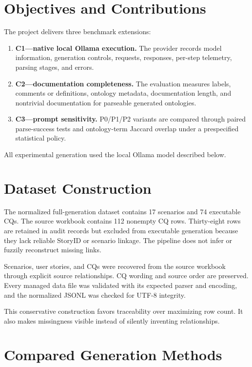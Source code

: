 \documentclass[11pt,a4paper]{article}
\begin{document}
\section{Objectives and Contributions}

The project delivers three benchmark extensions:

\begin{enumerate}
  \item \textbf{C1---native local Ollama execution.}
  The provider records model information, generation controls, requests,
  responses, per-step telemetry, parsing stages, and errors.

  \item \textbf{C2---documentation completeness.}
  The evaluation measures labels, comments or definitions, ontology
  metadata, documentation length, and nontrivial documentation for parseable
  generated ontologies.

  \item \textbf{C3---prompt sensitivity.}
  P0/P1/P2 variants are compared through paired parse-success tests and
  ontology-term Jaccard overlap under a prespecified statistical policy.
\end{enumerate}

All experimental generation used the local Ollama model described below.

\section{Dataset Construction}

The normalized full-generation dataset contains 17 scenarios and 74 executable
CQs. The source workbook contains 112 nonempty CQ rows. Thirty-eight rows are
retained in audit records but excluded from executable generation because they
lack reliable StoryID or scenario linkage. The pipeline does not infer or
fuzzily reconstruct missing links.

Scenarios, user stories, and CQs were recovered from the source workbook through
explicit source relationships. CQ wording and source order are preserved. Every
managed data file was validated with its expected parser and encoding, and the
normalized JSONL was checked for UTF-8 integrity.

This conservative construction favors traceability over maximizing row count.
It also makes missingness visible instead of silently inventing relationships.

\section{Compared Generation Methods}
\end{document}
